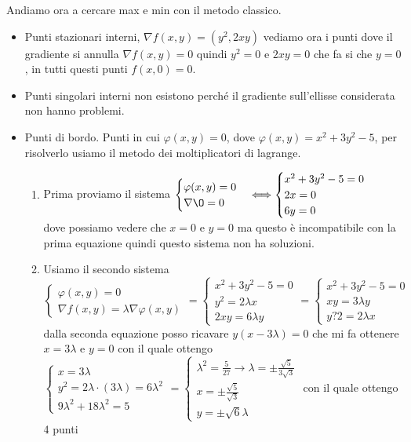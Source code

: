 Andiamo ora a cercare max e min con il metodo classico.
\begin{itemize}
    \item Punti stazionari interni, $\nabla f(x,y) = (y^2, 2xy)$ vediamo ora i punti dove il gradiente si annulla $\nabla f(x,y) = 0$ quindi $y^2 = 0$ e $2xy = 0$ che fa si che $y = 0$, in tutti questi punti $f(x,0) = 0$.
    \item Punti singolari interni non esistono perché il gradiente sull'ellisse considerata non hanno problemi.
    \item Punti di bordo. Punti in cui $\varphi(x,y) = 0$, dove $\varphi(x,y) = x^2 + 3y^2 - 5$, per risolverlo usiamo il metodo dei moltiplicatori di lagrange.
    \begin{enumerate}
        \item Prima proviamo il sistema $\begin{cases}\varphi(x,y) = 0 \\ \nabla \O = 0\end{cases} \Longleftrightarrow \begin{cases}x^2 + 3y^2 - 5 = 0 \\ 2x = 0 \\6y = 0\end{cases}$ dove possiamo vedere che $x = 0$ e $y = 0$ ma questo è incompatibile con la prima equazione quindi questo sistema non ha soluzioni.
        \item Usiamo il secondo sistema \\
        $\begin{cases}\varphi(x,y) = 0 \\ \nabla f(x,y) = \lambda \nabla \varphi(x,y)\end{cases} = \begin{cases}x^2 + 3y^2 -5 = 0\\ y ^2 = 2 \lambda x \\ 2xy = 6 \lambda y\end{cases} = \begin{cases}x^2 + 3y^2 - 5 = 0 \\ xy = 3\lambda y \\ y?2 = 2 \lambda x\end{cases}$ dalla seconda equazione posso ricavare $y (x - 3\lambda) = 0$ che mi fa ottenere $x = 3 \lambda$ e $y = 0$ con il quale ottengo $\begin{cases}x = 3 \lambda \\ y^2 = 2 \lambda \cdot (3 \lambda) = 6 \lambda^2 \\ 9\lambda^2 + 18\lambda^2 = 5\end{cases} = \begin{cases}\lambda^2 = \frac{5}{27} \to \lambda = \pm \frac{\sqrt{5}}{3\sqrt{3}}\\ x = \pm \frac{\sqrt{5}}{\sqrt{3}} \\ y = \pm \sqrt{6}\lambda\end{cases}$ con il quale ottengo 4 punti\\\\

\end{enumerate}
\end{itemize}
